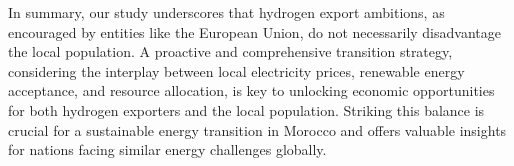 In summary, our study underscores that hydrogen export ambitions, as encouraged by entities like the European Union, do not necessarily disadvantage the local population. A proactive and comprehensive transition strategy, considering the interplay between local electricity prices, renewable energy acceptance, and resource allocation, is key to unlocking economic opportunities for both hydrogen exporters and the local population. Striking this balance is crucial for a sustainable energy transition in Morocco and offers valuable insights for nations facing similar energy challenges globally.

